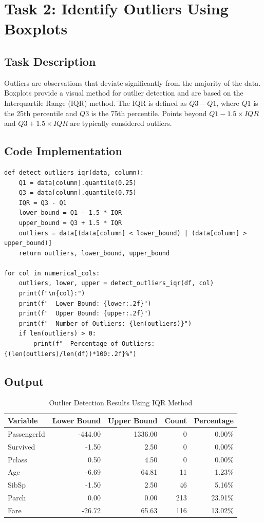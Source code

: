 \documentclass[12pt,a4paper]{article}
\begin{document}
\section{Task 2: Identify Outliers Using Boxplots}

\subsection{Task Description}

Outliers are observations that deviate significantly from the majority of the data. Boxplots provide a visual method for outlier detection and are based on the Interquartile Range (IQR) method. The IQR is defined as $Q3 - Q1$, where $Q1$ is the 25th percentile and $Q3$ is the 75th percentile. Points beyond $Q1 - 1.5 \times IQR$ and $Q3 + 1.5 \times IQR$ are typically considered outliers.

\subsection{Code Implementation}

\begin{lstlisting}
def detect_outliers_iqr(data, column):
    Q1 = data[column].quantile(0.25)
    Q3 = data[column].quantile(0.75)
    IQR = Q3 - Q1
    lower_bound = Q1 - 1.5 * IQR
    upper_bound = Q3 + 1.5 * IQR
    outliers = data[(data[column] < lower_bound) | (data[column] > upper_bound)]
    return outliers, lower_bound, upper_bound

for col in numerical_cols:
    outliers, lower, upper = detect_outliers_iqr(df, col)
    print(f"\n{col}:")
    print(f"  Lower Bound: {lower:.2f}")
    print(f"  Upper Bound: {upper:.2f}")
    print(f"  Number of Outliers: {len(outliers)}")
    if len(outliers) > 0:
        print(f"  Percentage of Outliers: {(len(outliers)/len(df))*100:.2f}%")
\end{lstlisting}

\subsection{Output}

\begin{table}[h]
\centering
\small
\begin{tabular}{l|r|r|r|r}
\toprule
\textbf{Variable} & \textbf{Lower Bound} & \textbf{Upper Bound} & \textbf{Count} & \textbf{Percentage} \\
\midrule
PassengerId & -444.00 & 1336.00 & 0 & 0.00\% \\
Survived & -1.50 & 2.50 & 0 & 0.00\% \\
Pclass & 0.50 & 4.50 & 0 & 0.00\% \\
Age & -6.69 & 64.81 & 11 & 1.23\% \\
SibSp & -1.50 & 2.50 & 46 & 5.16\% \\
Parch & 0.00 & 0.00 & 213 & 23.91\% \\
Fare & -26.72 & 65.63 & 116 & 13.02\% \\
\bottomrule
\end{tabular}
\caption{Outlier Detection Results Using IQR Method}
\end{table}
\end{document}

